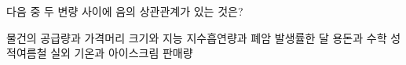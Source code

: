 다음 중 두 변량 사이에 음의 상관관계가 있는 것은?
\begin{choicesii}{물건의 공급량과 가격}{머리 크기와 지능 지수}{흡연량과 폐암 발생률}{한 달 용돈과 수학 성적}{여름철 실외 기온과 아이스크림 판매량}\end{choicesii}
